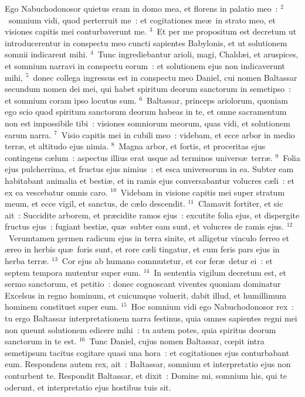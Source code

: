 \lettrine[lines=10,image=true,loversize=0.05,lraise=-0.03]{E}{}go Nabuchodonosor quietus eram in domo mea, et florens in palatio meo~:
${}^{2}$~somnium vidi, quod perterruit me~: et cogitationes me\ae\ in strato meo, et visiones capitis mei conturbaverunt me.
${}^{3}$~Et per me propositum est decretum ut introducerentur in conspectu meo cuncti sapientes Babylonis, et ut solutionem somnii indicarent mihi.
${}^{4}$~Tunc ingrediebantur arioli, magi, Chald\ae i, et aruspices, et somnium narravi in conspectu eorum~: et solutionem ejus non indicaverunt mihi,
${}^{5}$~donec collega ingressus est in conspectu meo Daniel, cui nomen Baltassar secundum nomen dei mei, qui habet spiritum deorum sanctorum in semetipso~: et somnium coram ipso locutus sum.
${}^{6}$~Baltassar, princeps ariolorum, quoniam ego scio quod spiritum sanctorum deorum habeas in te, et omne sacramentum non est impossibile tibi~: visiones somniorum meorum, quas vidi, et solutionem earum narra.
${}^{7}$~Visio capitis mei in cubili meo~: videbam, et ecce arbor in medio terr\ae , et altitudo ejus nimia.
${}^{8}$~Magna arbor, et fortis, et proceritas ejus contingens c\ae lum~: aspectus illius erat usque ad terminos univers\ae\ terr\ae .
${}^{9}$~Folia ejus pulcherrima, et fructus ejus nimius~: et esca universorum in ea. Subter eam habitabant animalia et besti\ae , et in ramis ejus conversabantur volucres c\ae li~: et ex ea vescebatur omnis caro.
${}^{10}$~Videbam in visione capitis mei super stratum meum, et ecce vigil, et sanctus, de c\ae lo descendit.
${}^{11}$~Clamavit fortiter, et sic ait~: Succidite arborem, et pr\ae cidite ramos ejus~: excutite folia ejus, et dispergite fructus ejus~: fugiant besti\ae , qu\ae\ subter eam sunt, et volucres de ramis ejus.
${}^{12}$~Verumtamen germen radicum ejus in terra sinite, et alligetur vinculo ferreo et \ae reo in herbis qu\ae\ foris sunt, et rore c\ae li tingatur, et cum feris pars ejus in herba terr\ae .
${}^{13}$~Cor ejus ab humano commutetur, et cor fer\ae\ detur ei~: et septem tempora mutentur super eum.
${}^{14}$~In sententia vigilum decretum est, et sermo sanctorum, et petitio~: donec cognoscant viventes quoniam dominatur Excelsus in regno hominum, et cuicumque voluerit, dabit illud, et humillimum hominem constituet super eum.
${}^{15}$~Hoc somnium vidi ego Nabuchodonosor rex~: tu ergo Baltassar interpretationem narra festinus, quia omnes sapientes regni mei non queunt solutionem edicere mihi~: tu autem potes, quia spiritus deorum sanctorum in te est.
${}^{16}$~Tunc Daniel, cujus nomen Baltassar, cœpit intra semetipsum tacitus cogitare quasi una hora~: et cogitationes ejus conturbabant eum. Respondens autem rex, ait~: Baltassar, somnium et interpretatio ejus non conturbent te. Respondit Baltassar, et dixit~: Domine mi, somnium his, qui te oderunt, et interpretatio ejus hostibus tuis sit.
